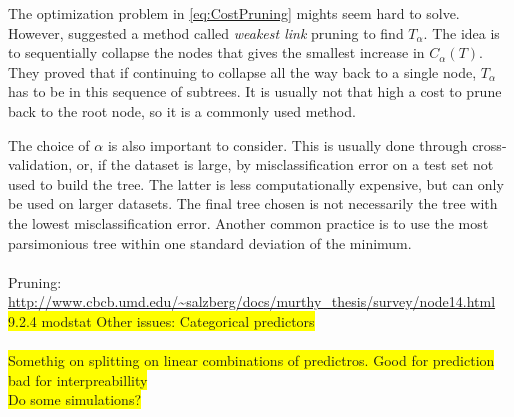 The optimization problem in \eqref{eq:CostPruning} mights seem hard to solve. However, \cite{breiman} suggested a method called \textit{weakest link} pruning to find $T_\alpha$. The idea is to sequentially collapse the nodes that gives the smallest increase in $C_\alpha(T)$.
They proved that if continuing to collapse all the way back to a single node, $T_\alpha$ has to be in this sequence of subtrees. It is usually not that high a cost to prune back to the root node, so it is a commonly used method.

The choice of $\alpha$ is also important to consider. This is usually done through cross-validation, or, if the dataset is large, by misclassification error on a test set not used to build the tree. The latter is less computationally expensive, but can only be used on larger datasets. 
The final tree chosen is not necessarily the tree with the lowest misclassification error. Another common practice is to use the most parsimonious tree within one standard deviation of the minimum.
\\
\\ Pruning: \url{http://www.cbcb.umd.edu/~salzberg/docs/murthy_thesis/survey/node14.html}\\
\colorbox{yellow}{9.2.4 modstat Other issues: Categorical predictors} \\ \\
%
\colorbox{yellow}{Somethig on splitting on linear combinations of predictros. Good for prediction bad for interpreabillity}\\
\colorbox{yellow}{Do some simulations?}\\


